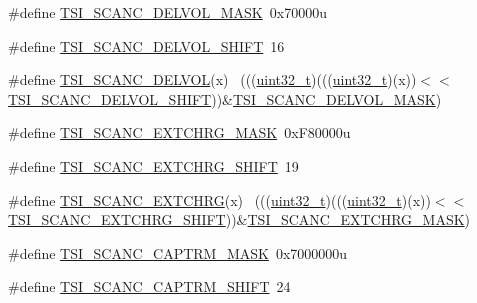 \begin{DoxyCompactItemize}
\item 
\#define \hyperlink{group___t_s_i___register___masks_gacc2a996e2da0e3fe992ebec8abce0bfc}{T\+S\+I\+\_\+\+S\+C\+A\+N\+C\+\_\+\+D\+E\+L\+V\+O\+L\+\_\+\+M\+A\+SK}~0x70000u
\item 
\#define \hyperlink{group___t_s_i___register___masks_ga0d433ad9b0f8826200b993e32c1c45cd}{T\+S\+I\+\_\+\+S\+C\+A\+N\+C\+\_\+\+D\+E\+L\+V\+O\+L\+\_\+\+S\+H\+I\+FT}~16
\item 
\#define \hyperlink{group___t_s_i___register___masks_ga977ce181c3df29137f666d62fc4275dd}{T\+S\+I\+\_\+\+S\+C\+A\+N\+C\+\_\+\+D\+E\+L\+V\+OL}(x)                                        ~(((\hyperlink{_p_e___types_8h_a33594304e786b158f3fb30289278f5af}{uint32\+\_\+t})(((\hyperlink{_p_e___types_8h_a33594304e786b158f3fb30289278f5af}{uint32\+\_\+t})(x))$<$$<$\hyperlink{group___t_s_i___register___masks_ga0d433ad9b0f8826200b993e32c1c45cd}{T\+S\+I\+\_\+\+S\+C\+A\+N\+C\+\_\+\+D\+E\+L\+V\+O\+L\+\_\+\+S\+H\+I\+FT}))\&\hyperlink{group___t_s_i___register___masks_gacc2a996e2da0e3fe992ebec8abce0bfc}{T\+S\+I\+\_\+\+S\+C\+A\+N\+C\+\_\+\+D\+E\+L\+V\+O\+L\+\_\+\+M\+A\+SK})
\item 
\#define \hyperlink{group___t_s_i___register___masks_gab5798996c8488e915c2db48de5f5d0bb}{T\+S\+I\+\_\+\+S\+C\+A\+N\+C\+\_\+\+E\+X\+T\+C\+H\+R\+G\+\_\+\+M\+A\+SK}~0x\+F80000u
\item 
\#define \hyperlink{group___t_s_i___register___masks_ga5381f1f7b0d3256890453050ef35486d}{T\+S\+I\+\_\+\+S\+C\+A\+N\+C\+\_\+\+E\+X\+T\+C\+H\+R\+G\+\_\+\+S\+H\+I\+FT}~19
\item 
\#define \hyperlink{group___t_s_i___register___masks_ga95fe823ddb5a6450bff2885fba98d5b3}{T\+S\+I\+\_\+\+S\+C\+A\+N\+C\+\_\+\+E\+X\+T\+C\+H\+RG}(x)                                      ~(((\hyperlink{_p_e___types_8h_a33594304e786b158f3fb30289278f5af}{uint32\+\_\+t})(((\hyperlink{_p_e___types_8h_a33594304e786b158f3fb30289278f5af}{uint32\+\_\+t})(x))$<$$<$\hyperlink{group___t_s_i___register___masks_ga5381f1f7b0d3256890453050ef35486d}{T\+S\+I\+\_\+\+S\+C\+A\+N\+C\+\_\+\+E\+X\+T\+C\+H\+R\+G\+\_\+\+S\+H\+I\+FT}))\&\hyperlink{group___t_s_i___register___masks_gab5798996c8488e915c2db48de5f5d0bb}{T\+S\+I\+\_\+\+S\+C\+A\+N\+C\+\_\+\+E\+X\+T\+C\+H\+R\+G\+\_\+\+M\+A\+SK})
\item 
\#define \hyperlink{group___t_s_i___register___masks_ga55a6de6ab83ae86173441040de6a0e90}{T\+S\+I\+\_\+\+S\+C\+A\+N\+C\+\_\+\+C\+A\+P\+T\+R\+M\+\_\+\+M\+A\+SK}~0x7000000u
\item 
\#define \hyperlink{group___t_s_i___register___masks_gaac5874a969cb660929d3536ca0f19ebb}{T\+S\+I\+\_\+\+S\+C\+A\+N\+C\+\_\+\+C\+A\+P\+T\+R\+M\+\_\+\+S\+H\+I\+FT}~24

\end{DoxyCompactItemize}
